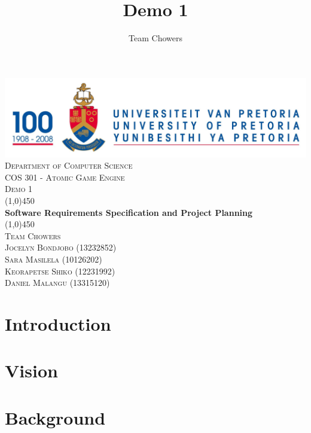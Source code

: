 \documentclass[a4paper,12pt]{article}
\author{Team Chowers}
\title{Demo 1}
\begin{document}
\setlength{\parskip}{6pt}

	\begin{titlepage}
		\begin{center}
			\includegraphics[width=1\textwidth]{./up-logo.jpg}\\[1.5cm] 
			\textsc{\LARGE Department of Computer Science} \\ [.5cm]
			\textsc{\Large COS 301 - Atomic Game Engine} \\ [.5cm]
			\textsc{\Large Demo 1} \\ [.5cm]
			\line(1,0){450}\\[.5cm]
			\huge{\bfseries Software Requirements Specification and Project Planning}\\
			\line(1,0){450}\\[.5cm]
			\textsc{\LARGE Team Chowers}\\ [0.5cm]
			
			
			\textsc{\small Jocelyn Bondjobo (13232852)}\\
			\textsc{\small Sara Masilela 	(10126202)}\\
			\textsc{\small Keorapetse Shiko (12231992)}\\
			\textsc{\small Daniel Malangu (13315120)}\\
			
		\end{center}
	\end{titlepage}
	
\tableofcontents
\thispagestyle{empty}
\footnotesize
\normalsize

\newpage
\section{Introduction}

\newpage
\section{Vision}

\newpage
\section{Background}
\end{document}

